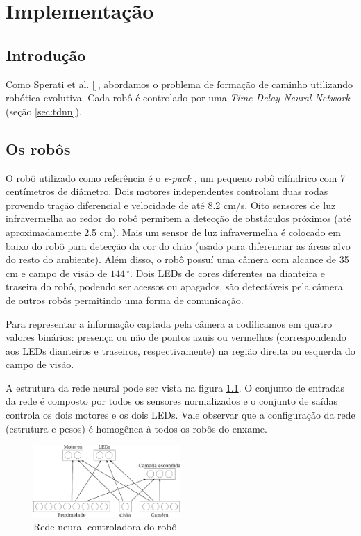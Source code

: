 \chapter{Implementação}
\label{implementacao}

\section{Introdução}

Como Sperati et al. [\cite{sperati2011path}], abordamos o problema de formação de caminho utilizando robótica evolutiva. Cada robô é controlado por uma \textit{Time-Delay Neural Network} (seção \ref{sec:tdnn}).

\section{Os robôs}

O robô utilizado como referência é o \textit{e-puck} \cite{mondada2009epuck}, um pequeno robô cilíndrico com 7 centímetros de diâmetro. Dois motores independentes controlam duas rodas provendo tração diferencial e velocidade de até 8.2 cm/s. Oito sensores de luz infravermelha ao redor do robô permitem a detecção de obstáculos próximos (até aproximadamente 2.5 cm). Mais um sensor de luz infravermelha é colocado em baixo do robô para detecção da cor do chão (usado para diferenciar as áreas alvo do resto do ambiente). Além disso, o robô possuí uma câmera com alcance de 35 cm e campo de visão de $144\,^{\circ}$. Dois LEDs de cores diferentes na dianteira e traseira do robô, podendo ser acessos ou apagados, são detectáveis pela câmera de outros robôs permitindo uma forma de comunicação.

Para representar a informação captada pela câmera a codificamos em quatro valores binários: presença ou não de pontos azuis ou vermelhos (correspondendo aos LEDs dianteiros e traseiros, respectivamente) na região direita ou esquerda do campo de visão.

A estrutura da rede neural pode ser vista na figura \ref{fig:robot-ann}. O conjunto de entradas da rede é composto por todos os sensores normalizados e o conjunto de saídas controla os dois motores e os dois LEDs. Vale observar que a configuração da rede (estrutura e pesos) é homogênea à todos os robôs do enxame.

\begin{figure}[H]
    \centering
    \includegraphics[width=0.5\textwidth]{figures/robot-ann}
    \caption{Rede neural controladora do robô}
    \label{fig:robot-ann}
\end{figure}

